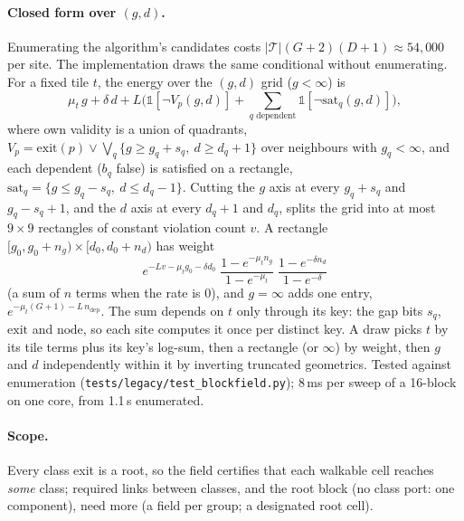 \documentclass[11pt]{article}
\newcommand{\1}{\mathds{1}}
\begin{document}
\paragraph{Closed form over $(g, d)$.} Enumerating the algorithm's candidates costs
$|\mathcal T| (G+2) (D+1) \approx 54{,}000$ per site. The implementation draws the same
conditional without enumerating. For a fixed tile $t$, the energy over the $(g,d)$ grid
($g < \infty$) is
\[
  \mu_t\, g + \delta\, d + L\Big(\1[\lnot V_p(g,d)] + \sum_{q \text{ dependent}} \1[\lnot \mathrm{sat}_q(g,d)]\Big),
\]
where own validity is a union of quadrants, $V_p = \mathrm{exit}(p) \lor \bigvee_q
\{g \ge g_q + s_q,\ d \ge d_q + 1\}$ over neighbours with $g_q < \infty$, and each dependent
($b_q$ false) is satisfied on a rectangle, $\mathrm{sat}_q = \{g \le g_q - s_q,\ d \le d_q - 1\}$.
Cutting the $g$ axis at every $g_q + s_q$ and $g_q - s_q + 1$, and the $d$ axis at every
$d_q + 1$ and $d_q$, splits the grid into at most $9 \times 9$ rectangles of constant
violation count $v$. A rectangle $[g_0, g_0 + n_g) \times [d_0, d_0 + n_d)$ has weight
\[
  e^{-Lv - \mu_t g_0 - \delta d_0}\;
  \frac{1 - e^{-\mu_t n_g}}{1 - e^{-\mu_t}}\;
  \frac{1 - e^{-\delta n_d}}{1 - e^{-\delta}}
\]
(a sum of $n$ terms when the rate is 0), and $g = \infty$ adds one entry,
$e^{-\mu_t (G+1) - L\,n_{\text{dep}}}$. The sum depends on $t$ only through its key: the gap
bits $s_q$, $\mathrm{exit}$ and $\mathrm{node}$, so each site computes it once per distinct
key. A draw picks $t$ by its tile terms plus its key's log-sum, then a rectangle (or
$\infty$) by weight, then $g$ and $d$ independently within it by inverting truncated
geometrics. Tested against enumeration (\texttt{tests/legacy/test\_blockfield.py}); 8\,ms per
sweep of a 16-block on one core, from 1.1\,s enumerated.

\paragraph{Scope.} Every class exit is a root, so the field certifies that
each walkable cell reaches \emph{some} class; required links between classes, and the root
block (no class port: one component), need more (a field per group; a designated root cell).
\end{document}
